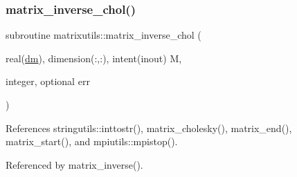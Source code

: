 \subsubsection{\texorpdfstring{matrix\+\_\+inverse\+\_\+chol()}{matrix\_inverse\_chol()}}
{\footnotesize\ttfamily subroutine matrixutils\+::matrix\+\_\+inverse\+\_\+chol (\begin{DoxyParamCaption}\item[{real(\mbox{\hyperlink{namespacematrixutils_a7bdc564986ea4d90f51201c75606ef3d}{dm}}), dimension(\+:,\+:), intent(inout)}]{M,  }\item[{integer, optional}]{err }\end{DoxyParamCaption})}



References stringutils\+::inttostr(), matrix\+\_\+cholesky(), matrix\+\_\+end(), matrix\+\_\+start(), and mpiutils\+::mpistop().



Referenced by matrix\+\_\+inverse().

